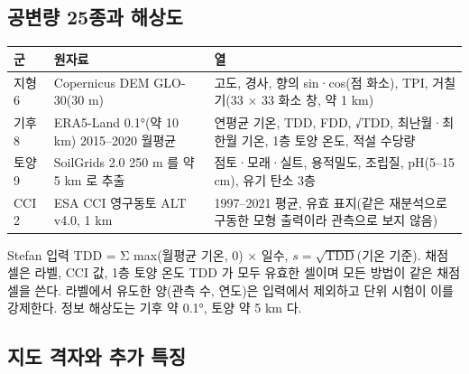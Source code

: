 \subsection{공변량 25종과 해상도}

\begin{center}\tabsmall
\begin{tabularx}{\textwidth}{@{}>{\raggedright\arraybackslash}p{2.6cm}>{\raggedright\arraybackslash}p{3.6cm}Y@{}}
\toprule
군 & 원자료 & 열 \\
\midrule
지형 6 & Copernicus DEM GLO-30(30 m) & 고도, 경사, 향의 sin·cos(점 화소), TPI, 거칠기(33 × 33 화소 창, 약 1 km) \\
기후 8 & ERA5-Land 0.1°(약 10 km) 2015–2020 월평균 & 연평균 기온, TDD, FDD, √TDD, 최난월·최한월 기온, 1층 토양 온도, 적설 수당량 \\
토양 9 & SoilGrids 2.0 250 m 를 약 5 km 로 추출 & 점토·모래·실트, 용적밀도, 조립질, pH(5–15 cm), 유기 탄소 3층 \\
CCI 2 & ESA CCI 영구동토 ALT v4.0, 1 km & 1997–2021 평균, 유효 표지(같은 재분석으로 구동한 모형 출력이라 관측으로 보지 않음) \\
\bottomrule
\end{tabularx}
\end{center}

Stefan 입력 TDD = Σ max(월평균 기온, 0) × 일수, $s = \sqrt{\mathrm{TDD}}$(기온 기준). 채점 셀은 라벨, CCI 값, 1층 토양 온도 TDD 가 모두 유효한 셀이며 모든 방법이 같은 채점 셀을 쓴다. 라벨에서 유도한 양(관측 수, 연도)은 입력에서 제외하고 단위 시험이 이를 강제한다. 정보 해상도는 기후 약 0.1°, 토양 약 5 km 다.

\subsection{지도 격자와 추가 특징}

